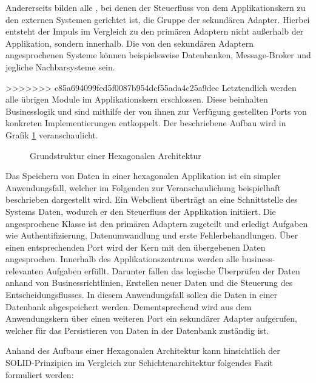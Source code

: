 Andererseits bilden alle , bei denen der Steuerfluss von dem Applikationskern zu den externen Systemen gerichtet ist, die Gruppe der sekundären Adapter. Hierbei entsteht der Impuls im Vergleich zu den primären Adaptern nicht außerhalb der Applikation, sondern innerhalb. Die von den sekundären Adaptern angesprochenen Systeme können beispielsweise Datenbanken, Message-Broker und jegliche Nachbarsysteme sein. 

>>>>>>> c85a694099fed5f0087b954dcf55ada4c25a9dec
Letztendlich werden alle übrigen Module im Applikationskern erschlossen. Diese beinhalten Businesslogik und sind mithilfe der von ihnen zur Verfügung gestellten Ports von konkreten Implementierungen entkoppelt. Der beschriebene Aufbau wird in Grafik \ref{fig:HexagonaleArchitektur} veranschaulicht.


\begin{figure}[htbp]
	\centering
	
	\caption{Grundstruktur einer Hexagonalen Architektur}
	\label{fig:HexagonaleArchitektur}
\end{figure}

Das Speichern von Daten in einer hexagonalen Applikation ist ein simpler Anwendungsfall, welcher im Folgenden zur Veranschaulichung beispielhaft beschrieben dargestellt wird. Ein Webclient überträgt an eine Schnittstelle des Systems Daten, wodurch er den Steuerfluss der Applikation initiiert. Die angesprochene Klasse ist den primären Adaptern zugeteilt und erledigt Aufgaben wie Authentifizierung, Datenumwandlung und erste Fehlerbehandlungen. Über einen entsprechenden Port wird der Kern mit den übergebenen Daten angesprochen. Innerhalb des Applikationszentrums werden alle business-relevanten Aufgaben erfüllt. Darunter fallen das logische Überprüfen der Daten anhand von Businessrichtlinien, Erstellen neuer Daten und die Steuerung des Entscheidungsflusses. In diesem Anwendungsfall sollen die Daten in einer Datenbank abgespeichert werden. Dementsprechend wird aus dem Anwendungskern über einen weiteren Port ein sekundärer Adapter aufgerufen, welcher für das Persistieren von Daten in der Datenbank zuständig ist.

Anhand des Aufbaus einer Hexagonalen Architektur kann hinsichtlich der SOLID-Prinzipien im Vergleich zur Schichtenarchitektur folgendes Fazit formuliert werden:

